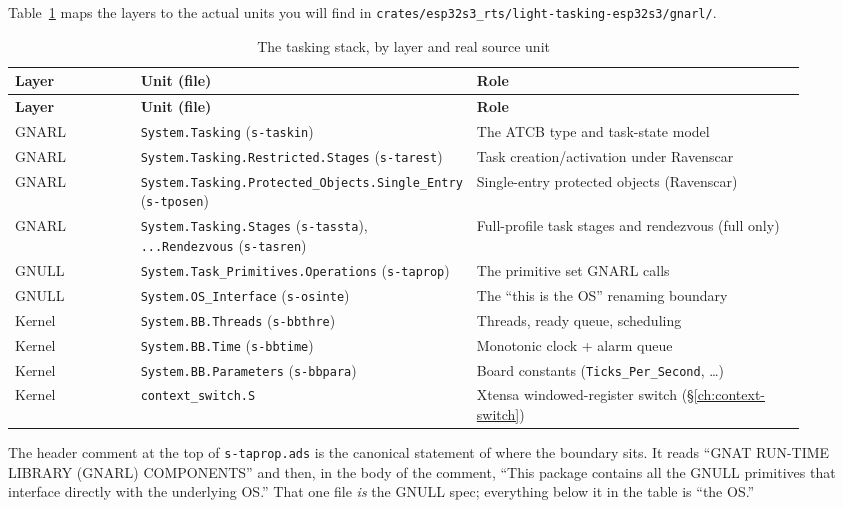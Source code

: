 Table~\ref{tab:gnarl-units} maps the layers to the actual units you will find in
\texttt{crates/esp32s3\_rts/light-tasking-esp32s3/gnarl/}.

\begin{longtable}{@{}p{0.16\linewidth}p{0.34\linewidth}p{0.42\linewidth}@{}}
\caption{The tasking stack, by layer and real source unit}
\label{tab:gnarl-units}\\
\toprule
\textbf{Layer} & \textbf{Unit (file)} & \textbf{Role} \\
\midrule
\endfirsthead
\toprule
\textbf{Layer} & \textbf{Unit (file)} & \textbf{Role} \\
\midrule
\endhead
GNARL & \texttt{System.Tasking} (\texttt{s-taskin}) & The ATCB type and task-state model \\
GNARL & \texttt{System.Tasking.Restricted.Stages} (\texttt{s-tarest}) & Task creation/activation under Ravenscar \\
GNARL & \texttt{System.Tasking.Protected\_Objects.Single\_Entry} (\texttt{s-tposen}) & Single-entry protected objects (Ravenscar) \\
GNARL & \texttt{System.Tasking.Stages} (\texttt{s-tassta}), \texttt{...Rendezvous} (\texttt{s-tasren}) & Full-profile task stages and rendezvous (full only) \\
GNULL & \texttt{System.Task\_Primitives.Operations} (\texttt{s-taprop}) & The primitive set GNARL calls \\
GNULL & \texttt{System.OS\_Interface} (\texttt{s-osinte}) & The ``this is the OS'' renaming boundary \\
Kernel & \texttt{System.BB.Threads} (\texttt{s-bbthre}) & Threads, ready queue, scheduling \\
Kernel & \texttt{System.BB.Time} (\texttt{s-bbtime}) & Monotonic clock + alarm queue \\
Kernel & \texttt{System.BB.Parameters} (\texttt{s-bbpara}) & Board constants (\texttt{Ticks\_Per\_Second}, \dots) \\
Kernel & \texttt{context\_switch.S} & Xtensa windowed-register switch (\S\ref{ch:context-switch}) \\
\bottomrule
\end{longtable}

The header comment at the top of \texttt{s-taprop.ads} is the canonical
statement of where the boundary sits. It reads ``GNAT RUN-TIME LIBRARY (GNARL)
COMPONENTS'' and then, in the body of the comment, ``This package contains all
the GNULL primitives that interface directly with the underlying OS.'' That one
file \emph{is} the GNULL spec; everything below it in the table is ``the OS.''

